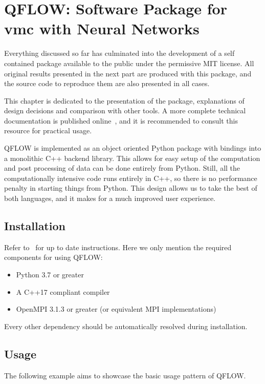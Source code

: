 \documentclass[Thesis.tex]{subfiles}
\begin{document}
\chapter{QFLOW: Software Package for \gls{vmc} with Neural Networks}
\label{chp:qflow}

Everything discussed so far has culminated into the development of a self
contained package available to the public under the permissive MIT license. All
original results presented in the next part are produced with this package, and
the source code to reproduce them are also presented in all cases.

This chapter is dedicated to the presentation of the package, explanations of
design decisions and comparison with other tools. A more complete technical
documentation is published online~\cite{qflow}, and it is recommended to consult this
resource for practical usage.

QFLOW is implemented as an object oriented Python package with bindings into a monolithic C++
backend library. This allows for easy setup of the computation and post
processing of data can be done entirely from Python. Still, all the
computationally intensive code runs entirely in C++, so there is no performance
penalty in starting things from Python. This design allows us to take the best
of both languages, and it makes for a much improved user experience.

\section{Installation}

Refer to~\cite{qflow} for up to date instructions. Here we only mention the
required components for using QFLOW:

\begin{itemize}
  \item Python 3.7 or greater
  \item A C++17 compliant compiler
  \item OpenMPI 3.1.3 or greater (or equivalent MPI implementations)
\end{itemize}
Every other dependency should be automatically resolved during installation.

\section{Usage}

The following example aims to showcase the basic usage pattern of QFLOW.
\end{document}
